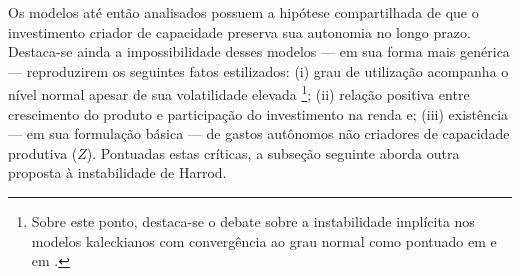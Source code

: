  
Os modelos até então analisados possuem a hipótese compartilhada de que o investimento criador de capacidade preserva sua autonomia no longo prazo.  
Destaca-se ainda a impossibilidade desses modelos --- em sua forma mais genérica --- reproduzirem os seguintes fatos estilizados: 
(i) grau de utilização acompanha o nível normal apesar de sua volatilidade elevada \cites[p.~110--111]{serrano_long_1995-1}{gahn_empirical_2019} \footnote{Sobre este ponto, destaca-se o debate sobre a instabilidade implícita nos modelos kaleckianos com convergência ao grau normal como pontuado em \textcite{hein_instability_2011} e em \textcite{allain_tackling_2015}.}; 
(ii) relação positiva entre crescimento do produto e participação do investimento na renda \cites{braga_investment_2018}{haluska_growth_2019} e;
(iii) existência --- em sua formulação básica --- de gastos autônomos não criadores de capacidade produtiva ($Z$).
Pontuadas estas críticas, a subseção seguinte aborda outra proposta à instabilidade de Harrod.


